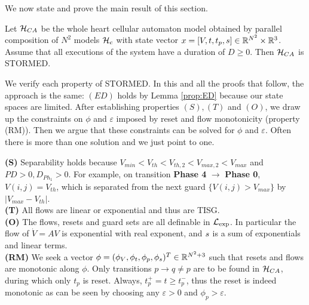We now state and prove the main result of this section.
\begin{thm}
	Let $\mathcal{H}_{CA}$ be the whole heart cellular automaton model obtained by parallel composition of $N^2$ models $\mathcal{H}_c$ with state vector $x = [V, t,t_p,s ] \in \mathbb{R}^{N^2}\times \mathbb{R}^{3}$.
	Assume that all executions of the system have a duration of $D\geq 0$.
	Then $\mathcal{H}_{CA}$ is STORMED.
\end{thm}
\begin{prf}
	We verify each property of STORMED.
In this and all the proofs that follow, the approach is the same: $(ED)$ holds by Lemma \ref{prop:ED} because our state spaces are limited.
After establishing properties $(S), (T)$ and $(O)$, we draw up the constraints on $\phi$ and $\varepsilon$ imposed by reset and flow monotonicity (property (RM)). 
Then we argue that these constraints can be solved for $\phi$ and $\varepsilon$.
Often there is more than one solution and we just point to one.

\textbf{(S)} Separability holds because $V_{min} < V_{th}< V_{th,2} < V_{max,2} < V_{max}$ and $PD>0,D_{Ph_1}>0$. 
For example, on transition \textbf{Phase 4} $\rightarrow$ \textbf{Phase 0}, $V(i,j)=V_{th}$, which is separated from the next guard $\{V(i,j) > V_{max}\}$ by $|V_{max}-V_{th}|$.
\\
\textbf{(T)} All flows are linear or exponential and thus are TISG.
\\
\textbf{(O)} The flows, resets and guard sets are all definable in $\mathcal{L}_{\exp}$.
In particular the flow of $\dot{V} = AV$ is exponential with real exponent, and $s$ is a sum of exponentials and linear terms.
\\
\textbf{(RM)}
We seek a vector $\phi = (\phi_V,\phi_t,\phi_p,\phi_s)^T \in \mathbb{R}^{N^2+3}$ such that resets and flows are monotonic along $\phi$.
Only transitions $p \rightarrow q \neq p$ are to be found in $\mathcal{H}_{CA}$, during which only $t_p$ is reset. 
Always, $t_p^+ = t \geq t_p^-$, thus the reset is indeed monotonic as can be seen by choosing any $\varepsilon >0$ and $\phi_p > \varepsilon$.


\end{prf}

